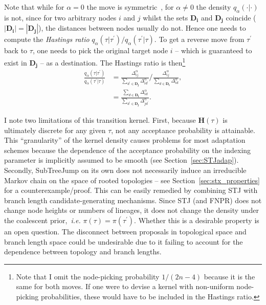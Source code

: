 Note that while for $\alpha = 0$ the move is symmetric~\citep{Hoehna2008}, for $\alpha \neq 0$ the density $q_{\alpha}(\cdot|\cdot)$ is not, since for two arbitrary nodes $i$ and $j$  whilst the sets $\mathbf{D_i}$ and $\mathbf{D_j}$ coincide ($|\mathbf{D_i}| = |\mathbf{D_j}|$), the distances between nodes usually do not.
Hence one needs to compute the \textit{Hastings ratio} $q_{\alpha}(\tau|\tau^\prime)/q_{\alpha}(\tau^\prime|\tau)$.
To get a reverse move from $\tau^\prime$ back to $\tau$, one needs to pick the original target node $i$  -- which is guaranteed to exist in $\mathbf{D_j}$ -- as a destination. 
The Hastings ratio is then\footnote{Note that I omit the node-picking probability $1/(2n-4)$ because it is the same for both moves. If one were to devise a kernel with non-uniform node-picking probabilities, these would have to be included in the Hastings ratio.}
\begin{align}
 \frac{q_{\alpha}(\tau| \tau^\prime)}{q_{\alpha}(\tau^\prime| \tau) }  &= \frac{\Delta_{ij}^{\alpha}}{\sum_{d^\prime \in \mathbf{D_j}}\Delta_{id^\prime}^{\alpha}} /\frac{\Delta_{ij}^{\alpha}}{\sum_{d \in \mathbf{D_i}}\Delta_{id}^{\alpha}}, \nonumber \\
 &  = \frac{\sum_{d \in \mathbf{D_i}}\Delta_{id}^{\alpha}}{\sum_{d^\prime \in \mathbf{D_j}}\Delta_{jd^\prime}^{\alpha}}.
\end{align}

I note two limitations of this transition kernel.
First, because $\mathbf{H}(\tau)$ is ultimately discrete for any given $\tau$, not any acceptance probability is attainable.
This ``granularity'' of the kernel density causes problems for most adaptation schemes because the dependence of the acceptance probability on the indexing parameter is implicitly assumed to be smooth (see Section~\ref{sec:STJadap}).
Secondly, SubTreeJump on its own does not necessarily induce an irreducible Markov chain on the space of rooted topologies  -- see Section~\ref{sec:stx_properties} for a counterexample/proof.
This can be easily remedied by combining STJ with branch length candidate-generating mechanisms.
Since STJ  (and FNPR) does not change node heights or numbers of lineages, it does not change the density under the coalescent prior,~\textit{i.e.} $\pi(\tau) = \pi(\tau^\prime)$.
Whether this is a desirable property is an open question.
The disconnect between proposals in topological space and branch length space could be undesirable due to it failing to account for the dependence between topology and branch lengths.

